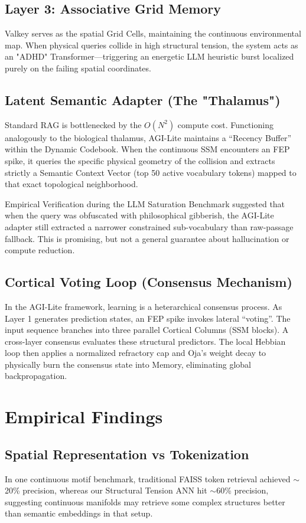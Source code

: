 \documentclass[11pt,twocolumn]{article}
\begin{document}
\subsection{Layer 3: Associative Grid Memory}
Valkey serves as the spatial Grid Cells, maintaining the continuous environmental map. When physical queries collide in high structural tension, the system acts as an "ADHD" Transformer---triggering an energetic LLM heuristic burst localized purely on the failing spatial coordinates.

\subsection{Latent Semantic Adapter (The "Thalamus")}
Standard RAG is bottlenecked by the $O(N^2)$ compute cost. Functioning analogously to the biological thalamus, AGI-Lite maintains a ``Recency Buffer'' within the Dynamic Codebook. When the continuous SSM encounters an FEP spike, it queries the specific physical geometry of the collision and extracts strictly a Semantic Context Vector (top 50 active vocabulary tokens) mapped to that exact topological neighborhood.

Empirical Verification during the LLM Saturation Benchmark suggested that when the query was obfuscated with philosophical gibberish, the AGI-Lite adapter still extracted a narrower constrained sub-vocabulary than raw-passage fallback. This is promising, but not a general guarantee about hallucination or compute reduction.

\subsection{Cortical Voting Loop (Consensus Mechanism)}
In the AGI-Lite framework, learning is a heterarchical consensus process. As Layer 1 generates prediction states, an FEP spike invokes lateral ``voting''. The input sequence branches into three parallel Cortical Columns (SSM blocks). A cross-layer consensus evaluates these structural predictors. The local Hebbian loop then applies a normalized refractory cap and Oja's weight decay to physically burn the consensus state into Memory, eliminating global backpropagation.

\section{Empirical Findings}

\subsection{Spatial Representation vs Tokenization}
In one continuous motif benchmark, traditional FAISS token retrieval achieved $\sim$20\% precision, whereas our Structural Tension ANN hit $\sim$60\% precision, suggesting continuous manifolds may retrieve some complex structures better than semantic embeddings in that setup.
\end{document}
